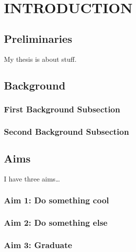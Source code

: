 \chapter{\uppercase{Introduction}} \label{chapter:01}

\section{Preliminaries}
My thesis is about stuff.
\lipsum[2]

\section{Background}
\lipsum[1]

\subsection{First Background Subsection}
\lipsum

\subsection{Second Background Subsection}
\lipsum

\section{Aims}
I have three aims\ldots

\subsection{Aim 1: Do something cool}
\lipsum[1]

\subsection{Aim 2: Do something else}
\lipsum[1]

\subsection{Aim 3: Graduate}
\lipsum[1]

